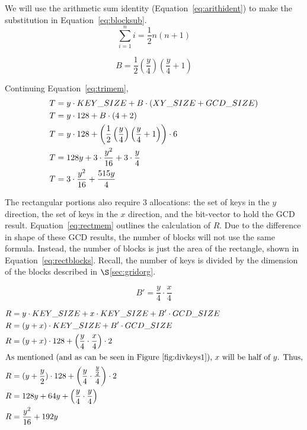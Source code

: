 \documentclass[smallextended]{svjour3}       %
\begin{document}
\noindent We will use the arithmetic sum identity (Equation~\ref{eq:arithident}) to make the substitution in Equation~\ref{eq:blocksub}.
\begin{equation}
   \sum_{i=1}^{n}i = \frac{1}{2}n\left(n+1\right)
   \label{eq:arithident}
\end{equation}

\begin{equation}
   B = \frac{1}{2}\left(\frac{y}{4}\right) \left(\frac{y}{4}+1\right)
   \label{eq:blocksub}
\end{equation}

\noindent Continuing Equation~\ref{eq:trimem},
\begin{align}
   T & = y \cdot KEY\_SIZE + B \cdot (XY\_SIZE + GCD\_SIZE)\notag\\
   T & = y \cdot 128 + B \cdot (4 + 2)\notag\\
   T & = y \cdot 128 + \left(\frac{1}{2}\left(\frac{y}{4}\right)\left(\frac{y}{4}+1\right)\right) \cdot 6\notag\\
   T & = 128 y + 3 \cdot \frac{y^2}{16} + 3 \cdot \frac{y}{4}\notag\\
   T & = 3 \cdot \frac{y^2}{16} + \frac{515y}{4}
   \label{eq:trimemcomplete}
\end{align}

The rectangular portions also require 3 allocations: the set of keys in the $y$ direction, the set of keys in the $x$ direction, and the bit-vector to hold the GCD result. Equation~\ref{eq:rectmem} outlines the calculation of $R$. Due to the difference in shape of these GCD results, the number of blocks will not use the same formula. Instead, the number of blocks is just the area of the rectangle, shown in Equation~\ref{eq:rectblocks}. Recall, the number of keys is divided by the dimension of the blocks described in $\S$\ref{sec:gridorg}.

\begin{equation}
   B' = \frac{y}{4} \cdot \frac{x}{4}
   \label{eq:rectblocks}
\end{equation}

\begin{align}
   R & = y \cdot KEY\_SIZE + x \cdot KEY\_SIZE + B' \cdot GCD\_SIZE\\
   R & = (y + x) \cdot KEY\_SIZE + B' \cdot GCD\_SIZE\notag\\
   R & = (y + x) \cdot 128 + \left(\frac{y}{4} \cdot \frac{x}{4}\right) \cdot 2\notag\\
   \intertext{As mentioned (and as can be seen in Figure~\ref{fig:divkeys1}), $x$ will be half of $y$. Thus,}
   R & = (y + \frac{y}{2}) \cdot 128 + \left(\frac{y}{4} \cdot \frac{\frac{y}{2}}{4}\right) \cdot 2\notag\\
   R & = 128y + 64y + \left(\frac{y}{4} \cdot \frac{y}{4}\right)\notag\\
   R & = \frac{y^2}{16} + 192y
   \label{eq:rectmem}
\end{align}
\end{document}
